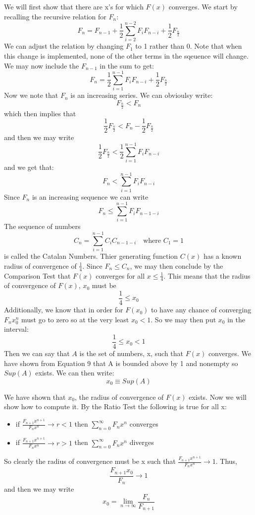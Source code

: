 \documentclass{article}
\begin{document}
We will first show that there are x's for which \(F(x)\) converges. We start by recalling the recursive relation for \(F_n\):
\begin{equation}
F_n=F_{n-1}+\frac{1}{2}\sum_{i=2}^{n-2}F_iF_{n-i}+\frac{1}{2}F_{\frac{n}{2}}
\end{equation}
We can adjust the relation by changing \(F_1\) to 1 rather than 0. Note that when this change is implemented, none of the other terms in the sqeuence will change. We may now include the \(F_{n-1}\) in the sum to get:
\begin{equation}
F_n=\frac{1}{2}\sum_{i=1}^{n-1}F_iF_{n-i}+\frac{1}{2}F_{\frac{n}{2}}
\end{equation}
Now we note that \(F_n\) is an increasing series. We can obvioulsy write:
\[F_\frac{n}{2}<F_n\]
which then implies that 
\[\frac{1}{2}F_\frac{n}{2}<F_n-\frac{1}{2}F_\frac{n}{2}\]
and then we may write
\[\frac{1}{2}F_\frac{n}{2}<\frac{1}{2}\sum_{i=1}^{n-1}F_iF_{n-i}\]
and we get that:
\[F_n<\sum_{i=1}^{n-1}F_iF_{n-i}\]
Since \(F_n\) is an increasing sequence we can write
\begin{equation}
F_n \leq \sum_{i=1}^{n-1}F_iF_{n-1-i}
\end{equation}
The sequence of numbers
\begin{equation}
C_n=\sum_{i=1}^{n-1}C_iC_{n-1-i} \quad \text{where } C_1=1
\end{equation}
is called the Catalan Numbers. Thier generating function \(C(x)\) has a known radius of convergence of \(\frac{1}{4}\). Since \(F_n \leq C_n \), we may then conclude by the Comparison Test that \(F(x)\) converges for all \(x \leq \frac{1}{4}\). This means that the radius of convergence of \(F(x)\), \(x_0\) must be 
\[\frac{1}{4} \leq x_0\]
Additionally, we know that in order for \(F(x_0)\) to have any chance of converging \(F_nx_0^n\) must go to zero so at the very least \(x_0 < 1\). So we may then put \(x_0\) in the interval:
\begin{equation}
\frac{1}{4}\leq x_0 < 1
\end{equation}
Then we can say that \(A\) is the set of numbers, x, such that \(F(x)\) converges. We have shown from Equation 9 that A is bounded above by 1  and nonempty so \(Sup(A)\) exists. We can then write:
\begin{equation}
x_0 \equiv Sup(A)
\end{equation}

We have shown that \(x_0\), the radius of convergence of \(F(x)\) exists. Now we will show how to compute it. By the Ratio Test the following is true for all x:
\begin{itemize}
\item if \(\frac{F_{n+1}x^{n+1}}{F_nx^n} \to r<1\) then \(\sum_{n=0}^\infty F_nx^n\) converges
\item if \(\frac{F_{n+1}x^{n+1}}{F_nx^n} \to r>1\) then \(\sum_{n=0}^\infty F_nx^n\) diverges
\end{itemize}
So clearly the radius of convergence must be x such that \(\frac{F_{n+1}x^{n+1}}{F_nx^n} \to 1\). Thus,
\[\frac{F_{n+1}x_0}{F_n} \to 1\]
and then we may write
\begin{equation}
x_0=\lim_{n\to\infty} \frac{F_n}{F_{n+1}}
\end{equation}
\end{document}
